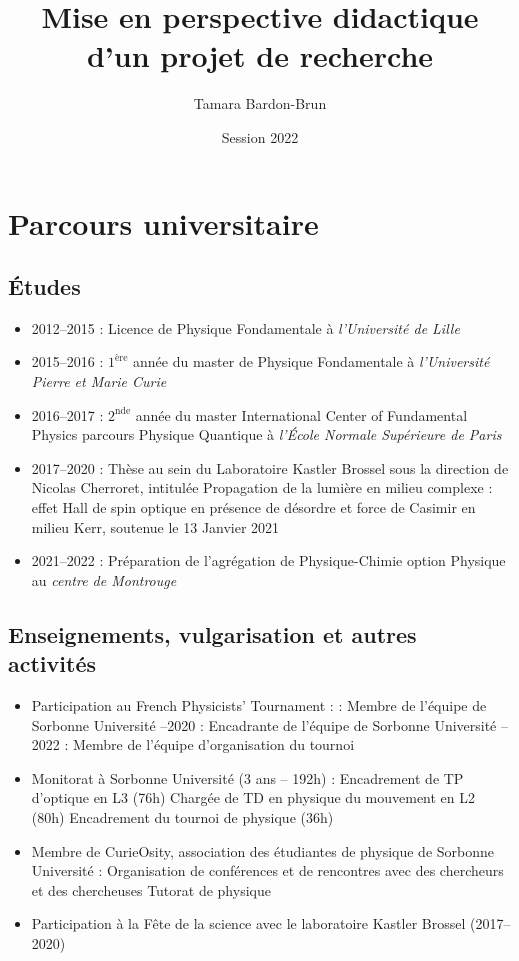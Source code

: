\documentclass[a4paper,11pt]{article} %
\title{Mise en perspective didactique d'un projet de recherche}
\author{Tamara Bardon-Brun}
\date{Session 2022}
\newcommand{\pointmedian}{{\fontfamily{cmr}\selectfont\textperiodcentered}}
\begin{document}
	\label{key}
	\maketitle
	
	\section{Parcours universitaire}
	\subsection{\'{E}tudes}
	\begin{itemize}
		\item 2012--2015 : Licence de Physique Fondamentale à \textit{l'Université de Lille}
		\item 2015--2016 : $1^\text{ère}$ année du master de Physique Fondamentale à \textit{l'Université Pierre et Marie Curie}
		\item 2016--2017 : $2^\text{nde}$ année du master International Center of Fundamental Physics parcours Physique Quantique à \textit{l'\'{E}cole Normale Supérieure de Paris}
		\item 2017--2020 : Thèse au sein du Laboratoire Kastler Brossel sous la direction de Nicolas Cherroret, intitulée \og Propagation de la lumière en milieu complexe : effet Hall de spin optique en présence de désordre et force de Casimir en milieu Kerr\fg{}, soutenue le 13 Janvier 2021
		\item 2021--2022 : Préparation de l'agrégation de Physique-Chimie option Physique au \textit{centre de Montrouge}
	\end{itemize}
	
	\subsection{Enseignements, vulgarisation et autres activités}
	\begin{itemize}
		\item Participation au French Physicists' Tournament :
		 : Membre de l'équipe de Sorbonne Université
		--2020 : Encadrante de l'équipe de Sorbonne Université
		--2022 : Membre de l'équipe d'organisation du tournoi \\
		\item Monitorat à Sorbonne Université (3 ans -- 192h) :
		\subitem Encadrement de TP d'optique en L3 (76h)
		\subitem Chargée de TD en physique du mouvement en L2 (80h)
		\subitem Encadrement du tournoi de physique (36h)\\
		\item Membre de CurieOsity, association des étudiant\pointmedian{}es de physique de Sorbonne Université :
		\subitem Organisation de conférences et de rencontres avec des chercheurs et des chercheuses
		\subitem Tutorat de physique\\
		\item Participation à la Fête de la science avec le laboratoire Kastler Brossel (2017--2020)
	\end{itemize}
\end{document}
